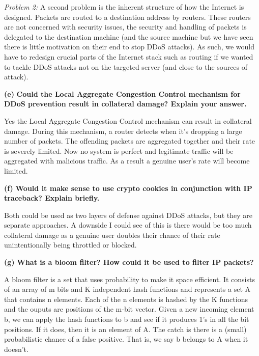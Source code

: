 \documentclass[11pt]{article}
\renewcommand\part[1]{\vspace{.10in}\textbf{(#1)}}
\begin{document}
\textit{Problem 2:} A second problem is the inherent structure of how the Internet is designed. Packets are routed to a destination address by routers. These routers are not concerned with security issues, the security and handling of packets is delegated to the destination machine (and the source machine but we have seen there is little motivation on their end to stop DDoS attacks). As such, we would have to redesign crucial parts of the Internet stack such as routing if we wanted to tackle DDoS attacks not on the targeted server (and close to the sources of attack).

\part{e} \textbf{Could the Local Aggregate Congestion Control mechanism for DDoS prevention result in collateral damage? Explain your answer.}

Yes the Local Aggregate Congestion Control mechanism can result in collateral damage. During this mechanism, a router detects when it's dropping a large number of packets. The offending packets are aggregated together and their rate is severely limited. Now no system is perfect and legitimate traffic will be aggregated with malicious traffic. As a result a genuine user's rate will become limited.

\part{f} \textbf{Would it make sense to use crypto cookies in conjunction with IP traceback? Explain briefly.}

Both could be used as two layers of defense against DDoS attacks, but they are separate approaches. A downside I could see of this is there would be too much collateral damage as a genuine user doubles their chance of their rate unintentionally being throttled or blocked.

\part{g} \textbf{What is a bloom filter? How could it be used to filter IP packets?}

A bloom filter is a set that uses probability to make it space efficient. It consists of an array of m bits and K independent hash functions and represents a set A that contains n elements. Each of the n elements is hashed by the K functions and the ouputs are positions of the m-bit vector. Given a new incoming element b, we can apply the hash functions to b and see if it produces 1's in all the bit positions. If it does, then it is an element of A. The catch is there is a (small) probabilistic chance of a false positive. That is, we say b belongs to A when it doesn't.
\end{document}
